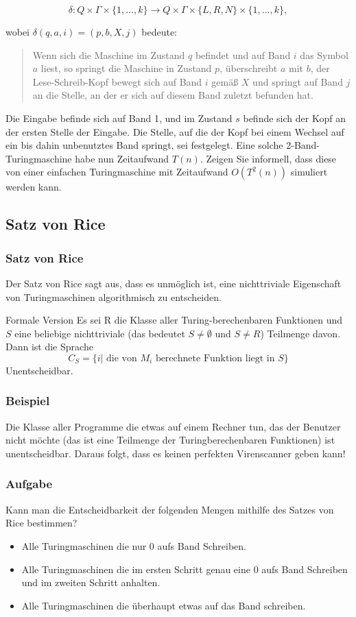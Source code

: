 \documentclass{beamer}
\begin{document}
{\begin{frame}
\[ \delta: Q \times \Gamma \times \{1, \ldots, k\} \to
Q \times \Gamma \times \{L, R, N\} \times \{1, \ldots, k\}, \]

wobei $\delta(q, a, i) = (p, b, X, j)$ bedeute:

\begin{quote}
  Wenn sich die Maschine im Zustand $q$ befindet und
  auf Band $i$ das Symbol $a$ liest, so springt die Maschine in Zustand $p$,
  überschreibt $a$ mit $b$, der Lese-Schreib-Kopf bewegt sich auf Band $i$
  gemäß $X$ und springt auf Band $j$ an die Stelle, an der er sich
  auf diesem Band zuletzt befunden hat.
\end{quote}

Die Eingabe befinde sich auf Band 1, und im Zustand $s$ befinde sich der
Kopf an der ersten Stelle der Eingabe. Die Stelle, auf die der Kopf bei einem
Wechsel auf ein bis dahin unbenutztes Band springt, sei
festgelegt.
Eine solche 2-Band-Turingmaschine habe nun Zeitaufwand $T(n)$.
Zeigen Sie informell, dass diese von einer einfachen
Turingmaschine mit Zeitaufwand $O(T^2(n))$ simuliert werden kann.\\
\end{frame}

\subsection{Satz von Rice}
\begin{frame}
\frametitle{Satz von Rice}
Der Satz von Rice sagt aus, dass es unmöglich ist, eine nichttriviale Eigenschaft von Turingmaschinen algorithmisch zu entscheiden.
\begin{block}{Formale Version}
Es sei R die Klasse aller Turing-berechenbaren Funktionen und $S$ eine beliebige nichttriviale (das bedeutet $S \neq \emptyset$ und $S \neq R$) Teilmenge davon. Dann ist die Sprache
$$ C_S = \{ i |\text{ die von $M_i$ berechnete Funktion liegt in $S$} \} $$
Unentscheidbar. 
\end{block}
\end{frame}
\begin{frame}
\frametitle{Beispiel}
Die Klasse aller Programme die etwas auf einem Rechner tun, das der Benutzer nicht möchte (das ist eine Teilmenge der Turingberechenbaren Funktionen) ist unentscheidbar. Daraus folgt, dass es keinen perfekten Virenscanner geben kann!
\end{frame}

\begin{frame}
\frametitle{Aufgabe}
Kann man die Entscheidbarkeit der folgenden Mengen mithilfe des Satzes von Rice bestimmen?
\begin{itemize}
\item Alle Turingmaschinen die nur $0$ aufs Band Schreiben.
\item Alle Turingmaschinen die im ersten Schritt genau eine $0$ aufs Band Schreiben und im zweiten Schritt anhalten. 
\item Alle Turingmaschinen die überhaupt etwas auf das Band schreiben.
\end{itemize}
\end{frame}

}
\end{document}
